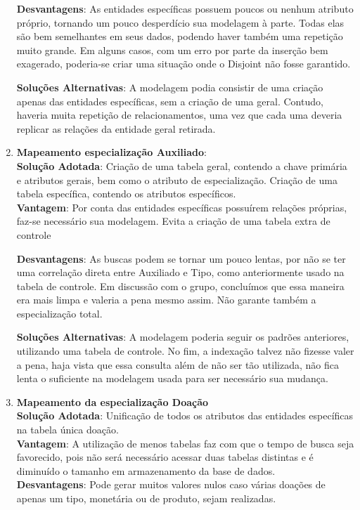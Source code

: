 \begin{enumerate}
    \textbf{Desvantagens}: As entidades específicas possuem poucos ou nenhum atributo próprio, tornando um pouco desperdício sua modelagem à parte. Todas elas são bem semelhantes em seus dados, podendo haver também uma repetição muito grande. Em alguns casos, com um erro por parte da inserção bem exagerado, poderia-se criar uma situação onde o Disjoint não fosse garantido. 

    \textbf{Soluções Alternativas}: A modelagem podia consistir de uma criação apenas das entidades específicas, sem a criação de uma geral. Contudo, haveria muita repetição de relacionamentos, uma vez que cada uma deveria replicar as relações da entidade geral retirada.

     \item \textbf{Mapeamento especialização Auxiliado}:
    \\
    \textbf{Solução Adotada}: Criação de uma tabela geral, contendo a chave primária e atributos gerais, bem como o atributo de especialização. Criação de uma tabela específica, contendo os atributos específicos.
    \\
    \textbf{Vantagem}: Por conta das entidades específicas possuírem relações próprias, faz-se necessário sua modelagem. Evita a criação de uma tabela extra de controle

    \textbf{Desvantagens}: As buscas podem se tornar um pouco lentas, por não se ter uma correlação direta entre Auxiliado e Tipo, como anteriormente usado na tabela de controle. Em discussão com o grupo, concluímos que essa maneira era mais limpa e valeria a pena mesmo assim. Não garante também a especialização total. 

    \textbf{Soluções Alternativas}: A modelagem poderia seguir os padrões anteriores, utilizando uma tabela de controle. No fim, a indexação talvez não fizesse valer a pena, haja vista que essa consulta além de não ser tão utilizada, não fica lenta o suficiente na modelagem usada para ser necessário sua mudança.
    
    
    \item \textbf{Mapeamento da especialização Doação}
    \\
    \textbf{Solução Adotada}: Unificação de todos os atributos das entidades específicas na tabela única doação.
    \\
    \textbf{Vantagem}: A utilização de menos tabelas faz com que o tempo de busca seja favorecido, pois não será necessário acessar duas tabelas distintas e é diminuído o tamanho em armazenamento da base de dados.
    \\ 
    \textbf{Desvantagens}: Pode gerar muitos valores nulos caso várias doações de apenas um tipo, monetária ou de produto, sejam realizadas.


\end{enumerate}
